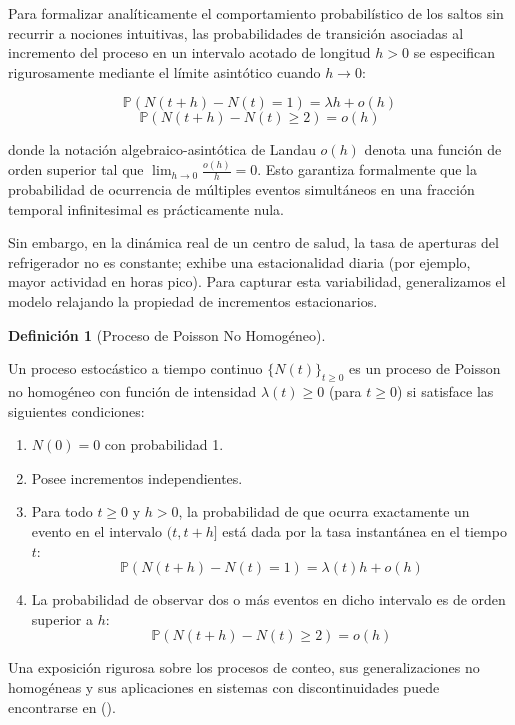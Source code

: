 \documentclass[
  spanish,
  letterpaper,
  DIV=11,
  numbers=noendperiod]{scrreprt}
\providecommand{\tightlist}{%
  \setlength{\itemsep}{0pt}\setlength{\parskip}{0pt}}
\theoremstyle{plain}
\theoremstyle{definition}
\newtheorem{definition}{Definición}[chapter]
\theoremstyle{remark}
\begin{document}
Para formalizar analíticamente el comportamiento probabilístico de los
saltos sin recurrir a nociones intuitivas, las probabilidades de
transición asociadas al incremento del proceso en un intervalo acotado
de longitud \(h > 0\) se especifican rigurosamente mediante el límite
asintótico cuando \(h \to 0\):

\[
\mathbb{P}(N(t+h) - N(t) = 1) = \lambda h + o(h)
\] \[
\mathbb{P}(N(t+h) - N(t) \ge 2) = o(h)
\]

donde la notación algebraico-asintótica de Landau \(o(h)\) denota una
función de orden superior tal que \(\lim_{h \to 0} \frac{o(h)}{h} = 0\).
Esto garantiza formalmente que la probabilidad de ocurrencia de
múltiples eventos simultáneos en una fracción temporal infinitesimal es
prácticamente nula.

Sin embargo, en la dinámica real de un centro de salud, la tasa de
aperturas del refrigerador no es constante; exhibe una estacionalidad
diaria (por ejemplo, mayor actividad en horas pico). Para capturar esta
variabilidad, generalizamos el modelo relajando la propiedad de
incrementos estacionarios.

\begin{definition}[Proceso de Poisson No
Homogéneo]\protect\hypertarget{def-poisson-no-homogeneo}{}\label{def-poisson-no-homogeneo}

Un proceso estocástico a tiempo continuo \(\{N(t)\}_{t \ge 0}\) es un
proceso de Poisson no homogéneo con función de intensidad
\(\lambda(t) \ge 0\) (para \(t \ge 0\)) si satisface las siguientes
condiciones:

\begin{enumerate}
\def\labelenumi{\arabic{enumi}.}
\tightlist
\item
  \(N(0) = 0\) con probabilidad 1.
\item
  Posee incrementos independientes.
\item
  Para todo \(t \ge 0\) y \(h > 0\), la probabilidad de que ocurra
  exactamente un evento en el intervalo \((t, t+h]\) está dada por la
  tasa instantánea en el tiempo \(t\): \[
  \mathbb{P}(N(t+h) - N(t) = 1) = \lambda(t) h + o(h)
  \]
\item
  La probabilidad de observar dos o más eventos en dicho intervalo es de
  orden superior a \(h\): \[
  \mathbb{P}(N(t+h) - N(t) \ge 2) = o(h)
  \]
\end{enumerate}

\end{definition}

Una exposición rigurosa sobre los procesos de conteo, sus
generalizaciones no homogéneas y sus aplicaciones en sistemas con
discontinuidades puede encontrarse en
().
\end{document}
